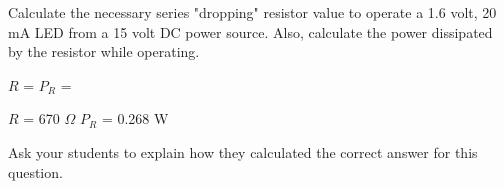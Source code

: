 

Calculate the necessary series "dropping" resistor value to operate a 1.6 volt, 20 mA LED from a 15 volt DC power source.  Also, calculate the power dissipated by the resistor while operating.

\vskip 10pt

$R$ = \hskip 50pt $P_R$ =

\vskip 10pt







$R$ = 670 $\Omega$  \hskip 30pt $P_R$ = 0.268 W







Ask your students to explain how they calculated the correct answer for this question.




